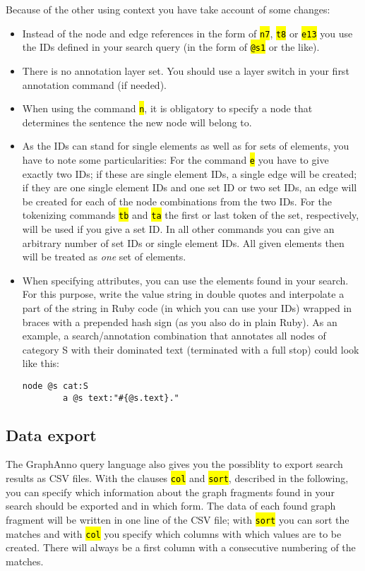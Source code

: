 \documentclass[12pt]{scrartcl}
\newcommand{\code}[1]{\hl{\texttt{#1}}}
\begin{document}
Because of the other using context you have take account of some changes:
\begin{itemize}
	\item Instead of the node and edge references in the form of \code{n7}, \code{t8} or \code{e13} you use the IDs defined in your search query (in the form of \code{@s1} or the like).
	\item There is no annotation layer set. You should use a layer switch in your first annotation command (if needed).
	\item When using the command \code{n}, it is obligatory to specify a node that determines the sentence the new node will belong to.
	\item As the IDs can stand for single elements as well as for sets of elements, you have to note some particularities: For the command \code{e} you have to give exactly two IDs; if these are single element IDs, a single edge will be created; if they are one single element IDs and one set ID or two set IDs, an edge will be created for each of the node combinations from the two IDs. For the tokenizing commands \code{tb} and \code{ta} the first or last token of the set, respectively, will be used if you give a set ID. In all other commands you can give an arbitrary number of set IDs or single element IDs. All given elements then will be treated as \textit{one} set of elements.
	\item When specifying attributes, you can use the elements found in your search. For this purpose, write the value string in double quotes and interpolate a part of the string in Ruby code (in which you can use your IDs) wrapped in braces with a prepended hash sign (as you also do in plain Ruby). As an example, a search/annotation combination that annotates all nodes of category S with their dominated text (terminated with a full stop) could look like this:
	\begin{lstlisting}[gobble=8]
		node @s cat:S
		a @s text:"#{@s.text}."
	\end{lstlisting}
\end{itemize}


\subsection{Data export}

The GraphAnno query language also gives you the possiblity to export search results as CSV files.
With the clauses \code{col} and \code{sort}, described in the following, you can specify which information about the graph fragments found in your search should be exported and in which form.
The data of each found graph fragment will be written in one line of the CSV file; with \code{sort} you can sort the matches and with \code{col} you specify which columns with which values are to be created.
There will always be a first column with a consecutive numbering of the matches.
\end{document}
